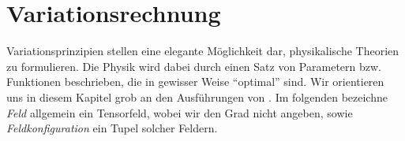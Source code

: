 
\section{Variationsrechnung}
Variationsprinzipien stellen eine elegante Möglichkeit dar, physikalische
Theorien zu formulieren. Die Physik wird dabei durch einen Satz
von Parametern bzw. Funktionen beschrieben, die in gewisser Weise "`optimal"'
sind.
Wir orientieren uns in diesem Kapitel grob an den Ausführungen von 
\cite[s.454 ff]{wald2010general}.
Im folgenden bezeichne \emph{Feld} allgemein ein Tensorfeld, wobei wir den
Grad nicht angeben, sowie \emph{Feldkonfiguration} ein Tupel solcher
Feldern.

